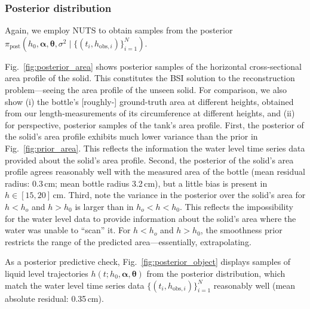 \documentclass[a4paper,fleqn]{cas-dc}
\newcommand\thedata {$\{(t_i,h_{\text{obs}, i})\}_{i=1}^{N}$\xspace}
\newcommand\thedatanomath {\{(t_i,h_{\text{obs}, i})\}_{i=1}^{N}}
\newcommand\themodel {$h(t; h_0, \boldsymbol \alpha, \boldsymbol\theta)$\xspace}
\begin{document}
\subsubsection{Posterior distribution}
Again, we employ NUTS to obtain samples from the posterior $\pi_{\text{post}}(h_0, \boldsymbol \alpha, \boldsymbol \theta, \sigma^2 \mid \thedatanomath)$. 

Fig.~\ref{fig:posterior_area} shows posterior samples of the horizontal cross-sectional area profile of the solid.
This constitutes the BSI solution to the reconstruction problem---seeing the area profile of the unseen solid. 
For comparison, we also show (i) the bottle's [roughly-] ground-truth area at different heights, obtained from our length-measurements of its circumference at different heights, and (ii) for perspective, posterior samples of the tank's area profile. First, the posterior of the solid's area profile exhibits much lower variance than the prior in Fig.~\ref{fig:prior_area}. This reflects the information the water level time series data provided about the solid's area profile. 
Second, the posterior of the solid's area profile agrees reasonably well with the measured area of the bottle (mean residual radius: 0.3\,cm; mean bottle radius 3.2\,cm), but a little bias is present in $h\in[15, 20]$\,cm.
Third, note the variance in the posterior over the solid's area for $h<h_o$ and $h>h_0$ is larger than in $h_o < h < h_0$. This reflects the impossibility for the water level data to provide information about the solid's area where the water was unable to ``scan'' it. 
For $h<h_o$ and $h>h_0$, the smoothness prior restricts the range of the predicted area---essentially, extrapolating. 

As a posterior predictive check, Fig.~\ref{fig:posterior_object} displays samples of liquid level trajectories \themodel from the posterior distribution, which match the water level time series data \thedata reasonably well (mean absolute residual: 0.35\,cm). 

\end{document}
